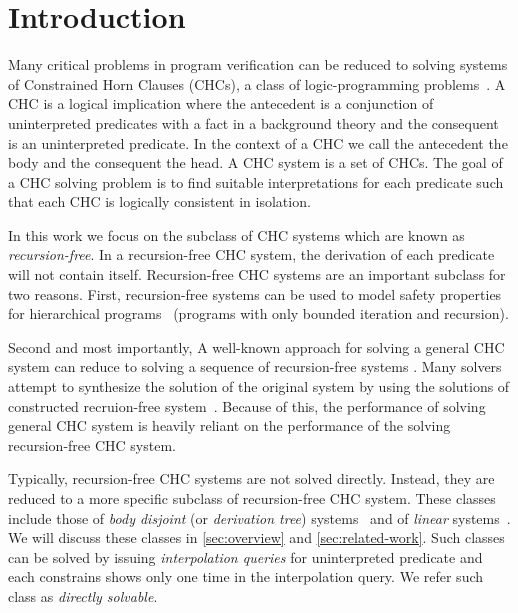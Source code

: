 \section{Introduction}
\label{sec:intro}
Many critical problems in program verification can be reduced to
solving systems of Constrained Horn Clauses (CHCs), a class of
logic-programming
problems~\cite{bjorner13,flanagan03,rummer13a,rummer13b}.
%
A CHC is a logical implication where the antecedent is a conjunction
of uninterpreted predicates with a fact in a background
theory and the consequent is an uninterpreted predicate. 
%
In the context of a CHC we call the antecedent the body and the
consequent the head.  A CHC system is a set of CHCs. 
%
The goal of a CHC solving problem is to find suitable interpretations
for each predicate such that each CHC is logically
consistent in isolation.

In this work we focus on the subclass of CHC systems which are known
as \emph{recursion-free}. In a recursion-free CHC system, the
derivation of each predicate will not contain
itself. 
%
Recursion-free CHC systems are an important subclass for two reasons.
%
First, recursion-free systems can be used to model safety properties
for hierarchical programs~\cite{lal-qadeer15,lal-qadeer-lahiri12}
(programs with only bounded iteration and recursion).



%
Second and most importantly, A well-known approach for solving a general CHC
system can reduce to solving a sequence of recursion-free
systems .
%
Many solvers attempt to synthesize the solution of the original system 
by using the solutions of constructed recruion-free system~\cite{bjorner13}.
%
Because of this, the performance of solving general CHC system is heavily reliant on the 
performance of the solving recursion-free CHC system.
%


Typically, recursion-free CHC systems are not solved directly.
%
Instead, they are reduced to a more specific subclass of
recursion-free CHC system.
%
These classes include those of
\emph{body disjoint} (or \emph{derivation tree})
systems~\cite{heizmann10,bjorner13,mcmillan14,rummer13a,rummer13b} and
of \emph{linear} systems~\cite{albarghouthi12a}.
%
We will discuss these classes in \autoref{sec:overview} and
\autoref{sec:related-work}.
%
Such classes can be solved by issuing
\emph{interpolation queries} for uninterpreted predicate and 
each constrains shows only one time in the interpolation query.
%
We
refer such class as \emph{directly solvable}.

